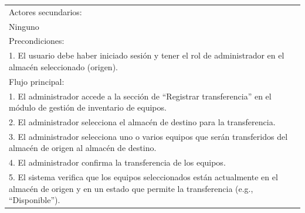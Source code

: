 \documentclass[stu, 12pt, letterpaper, donotrepeattitle, floatsintext, natbib]{apa7}
\begin{document}
\begin{longtable}{@{} p{16.5cm} @{}}
    Actores secundarios:                                                                                                                                                                                                                   \\
    Ninguno                                                                                                                                                                                                                                \\ \midrule
    Precondiciones:                                                                                                                                                                                                                        \\
    1. El usuario debe haber iniciado sesión y tener el rol de administrador en el almacén seleccionado (origen).                                                                                                                          \\ \midrule
    Flujo principal:                                                                                                                                                                                                                       \\
    1. El administrador accede a la sección de ``Registrar transferencia'' en el módulo de gestión de inventario de equipos.                                                                                                               \\
    2. El administrador selecciona el almacén de destino para la transferencia.                                                                                                                                                            \\
    3. El administrador selecciona uno o varios equipos que serán transferidos del almacén de origen al almacén de destino.                                                                                                                \\
    4. El administrador confirma la transferencia de los equipos.                                                                                                                                                                          \\
    5. El sistema verifica que los equipos seleccionados están actualmente en el almacén de origen y en un estado que permite la transferencia (e.g., ``Disponible'').                                                                     \\

\end{longtable}
\end{document}

